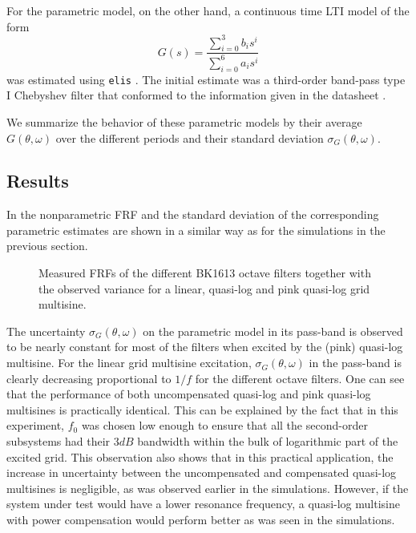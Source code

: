     For the parametric model, on the other hand, a continuous time LTI model of the form
    \begin{equation}
      G(s) = \frac{\sum_{i=0}^3 b_i s^i}{\sum_{i=0}^6 a_i s^i}
    \end{equation}
    was estimated using \texttt{elis} \citep{FDIDENT}.
    The initial estimate was a third-order band-pass type I Chebyshev filter \citep{Zverev1967} that conformed to the information given in the datasheet \citep{datasheet_bk1613}.

    We summarize the behavior of these parametric models by their average $G\left(\theta,\omega \right)$ over the different periods and their standard deviation $\sigma_G\left(\theta,\omega \right)$.

    \subsection{Results}
    In  the nonparametric FRF and the standard deviation of the corresponding parametric estimates are shown in a similar way as for the simulations in the previous section.

    \begin{figure}%
    \centering
      \setlength\figureheight{5cm}
      \setlength{}
    
    \caption[Measured FRFs of all BK1613 octave filters and their variance for different excitation signals.]{Measured FRFs of the different \bruelkjaer BK1613 octave filters together with the observed variance for a linear, quasi-log and pink quasi-log grid multisine.}%
      \label{fig:measurements}
    \end{figure}

    The uncertainty $\sigma_G\left(\theta,\omega\right)$ on the parametric model in its pass-band is observed to be nearly constant for most of the filters when excited by the (pink) quasi-log multisine.
    For the linear grid multisine excitation, $\sigma_G\left(\theta,\omega\right)$ in the pass-band is clearly decreasing proportional to $1 / f$ for the different octave filters.
    One can see that the performance of both uncompensated quasi-log and pink quasi-log multisines is practically identical.
    This can be explained by the fact that in this experiment, $f_0$ was chosen low enough to ensure that all the second-order subsystems had their $3\unit{dB}$ bandwidth within the bulk of logarithmic part of the excited grid.
    This observation also shows that in this practical application, the increase in uncertainty between the uncompensated and compensated quasi-log multisines is negligible, as was observed earlier in the simulations.
    However, if the system under test would have a lower resonance frequency, a quasi-log multisine with power compensation would perform better as was seen in the simulations.


